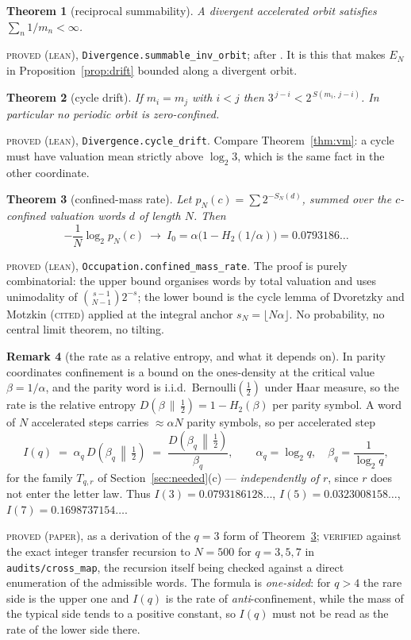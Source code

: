 \documentclass[11pt,reqno]{amsart}
\theoremstyle{plain}
\newtheorem{theorem}{Theorem}[section]
\theoremstyle{definition}
\newtheorem{remark}[theorem]{Remark}
\newcommand{\lab}[1]{\textnormal{\textsc{\small #1}}}
\begin{document}
\begin{theorem}[reciprocal summability]\label{thm:summable}
A divergent accelerated orbit satisfies $\sum_n 1/m_n<\infty$.
\end{theorem}
\lab{proved (lean)}, \texttt{Divergence.summable\_inv\_orbit}; after
\cite{Curry2026}. It is this that makes $E_N$ in Proposition~\ref{prop:drift}
bounded along a divergent orbit.

\begin{theorem}[cycle drift]\label{thm:cycledrift}
If $m_i=m_j$ with $i<j$ then $3^{\,j-i}<2^{\,S(m_i,\,j-i)}$. In particular no
periodic orbit is zero-confined.
\end{theorem}
\lab{proved (lean)}, \texttt{Divergence.cycle\_drift}. Compare
Theorem~\ref{thm:vm}: a cycle must have valuation mean strictly above $\log_2 3$,
which is the same fact in the other coordinate.

\begin{theorem}[confined-mass rate]\label{thm:rate}
Let $p_N(c)=\sum 2^{-S_N(d)}$, summed over the $c$-confined valuation words $d$ of
length $N$. Then
\[
-\frac1N\log_2 p_N(c)\ \longrightarrow\ I_0=\alpha\bigl(1-H_2(1/\alpha)\bigr)
=0.0793186\ldots
\]
\end{theorem}
\lab{proved (lean)}, \texttt{Occupation.confined\_mass\_rate}. The proof is purely
combinatorial: the upper bound organises words by total valuation and uses
unimodality of $\binom{s-1}{N-1}2^{-s}$; the lower bound is the cycle lemma of
Dvoretzky and Motzkin \cite{DvoretzkyMotzkin1947} (\lab{cited}) applied at the
integral anchor $s_N=\lfloor N\alpha\rfloor$. No probability, no central limit
theorem, no tilting.

\begin{remark}[the rate as a relative entropy, and what it depends on]\label{rem:rateq}
In parity coordinates confinement is a bound on the ones-density at the critical
value $\beta=1/\alpha$, and the parity word is i.i.d.\ Bernoulli$(\tfrac12)$ under
Haar measure, so the rate is the relative entropy
$D(\beta\,\|\,\tfrac12)=1-H_2(\beta)$ per parity symbol. A word of $N$ accelerated
steps carries $\approx\alpha N$ parity symbols, so per accelerated step
\[
I(q)\;=\;\alpha_q\,D\!\left(\beta_q\,\middle\|\,\tfrac12\right)
      \;=\;\frac{D\!\left(\beta_q\,\middle\|\,\tfrac12\right)}{\beta_q},
\qquad \alpha_q=\log_2 q,\quad \beta_q=\frac1{\log_2 q},
\]
for the family $T_{q,r}$ of Section~\ref{sec:needed}(c) --- \emph{independently of
$r$}, since $r$ does not enter the letter law. Thus $I(3)=0.0793186128\ldots$,
$I(5)=0.0323008158\ldots$, $I(7)=0.1698737154\ldots$.
\end{remark}
\lab{proved (paper)}, as a derivation of the $q=3$ form of Theorem~\ref{thm:rate};
\lab{verified} against the exact integer transfer recursion to $N=500$ for
$q=3,5,7$ in \texttt{audits/cross\_map}, the recursion itself being checked against
a direct enumeration of the admissible words. The formula is \emph{one-sided}: for
$q>4$ the rare side is the upper one and $I(q)$ is the rate of
\emph{anti}-confinement, while the mass of the typical side tends to a positive
constant, so $I(q)$ must not be read as the rate of the lower side there.
\end{document}
